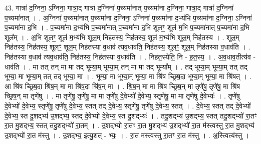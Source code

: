 \documentclass[17pt]{extarticle}
\begin{document}
43. गात्रा॑ द॒ग्निना॒ ऽग्निना॒ गात्रा॒द् गात्रा॑ द॒ग्निना॑ प॒च्यमा॑नात् प॒च्यमा॑ना द॒ग्निना॒ गात्रा॒द् गात्रा॑ द॒ग्निना॑ प॒च्यमा॑नात् । . अ॒ग्निना॑ प॒च्यमा॑नात् प॒च्यमा॑ना द॒ग्निना॒ ऽग्निना॑ प॒च्यमा॑ना द॒भ्य॑भि प॒च्यमा॑ना द॒ग्निना॒ ऽग्निना॑ प॒च्यमा॑ना द॒भि । . प॒च्यमा॑ना द॒भ्य॑भि प॒च्यमा॑नात् प॒च्यमा॑ना द॒भि शूलꣳ॒॒ शूल॑ म॒भि प॒च्यमा॑नात् प॒च्यमा॑ना द॒भि शूल᳚म् । . अ॒भि शूलꣳ॒॒ शूल॑ म॒भ्य॑भि शूल॒म् निह॑तस्य॒ निह॑तस्य॒ शूल॑ म॒भ्य॑भि शूल॒म् निह॑तस्य । . शूल॒म् निह॑तस्य॒ निह॑तस्य॒ शूलꣳ॒॒ शूल॒म् निह॑तस्या व॒धाव॑ त्यव॒धाव॑ति॒ निह॑तस्य॒ शूलꣳ॒॒ शूल॒म् निह॑तस्या व॒धाव॑ति । . निह॑तस्या व॒धाव॑ त्यव॒धाव॑ति॒ निह॑तस्य॒ निह॑तस्या व॒धाव॑ति । . निह॑त॒स्येति॒ नि - ह॒त॒स्य॒ । . अ॒व॒धाव॒तीत्य॑व - धाव॑ति । . मा तत् तन् मा मा तद् भूम्या॒म् भूम्या॒म् तन् मा मा तद् भूम्या᳚म् । . तद् भूम्या॒म् भूम्या॒म् तत् तद् भूम्या॒ मा भूम्या॒म् तत् तद् भूम्या॒ मा । . भूम्या॒ मा भूम्या॒म् भूम्या॒ मा श्रि॑ष च्छ्रिष॒दा भूम्या॒म् भूम्या॒ मा श्रि॑षत् । . आ श्रि॑ष च्छ्रिष॒दा श्रि॑ष॒न् मा मा श्रि॑ष॒दा श्रि॑ष॒न् मा । . श्रि॒ष॒न् मा मा श्रि॑ष च्छ्रिष॒न् मा तृणे॑षु॒ तृणे॑षु॒ मा श्रि॑ष च्छ्रिष॒न् मा तृणे॑षु । . मा तृणे॑षु॒ तृणे॑षु॒ मा मा तृणे॑षु दे॒वेभ्यो॑ दे॒वेभ्य॒ स्तृणे॑षु॒ मा मा तृणे॑षु दे॒वेभ्यः॑ । . तृणे॑षु दे॒वेभ्यो॑ दे॒वेभ्य॒ स्तृणे॑षु॒ तृणे॑षु दे॒वेभ्य॒ स्तत् तद् दे॒वेभ्य॒ स्तृणे॑षु॒ तृणे॑षु दे॒वेभ्य॒ स्तत् । . दे॒वेभ्य॒ स्तत् तद् दे॒वेभ्यो॑ दे॒वेभ्य॒ स्त दु॒शद्भ्य॑ उ॒शद्भ्य॒ स्तद् दे॒वेभ्यो॑ दे॒वेभ्य॒ स्त दु॒शद्भ्यः॑ । . तदु॒शद्भ्य॑ उ॒शद्भ्य॒ स्तत् तदु॒शद्भ्यो॑ रा॒तꣳ रा॒त मु॒शद्भ्य॒ स्तत् तदु॒शद्भ्यो॑ रा॒तम् । . उ॒शद्भ्यो॑ रा॒तꣳ रा॒त मु॒शद्भ्य॑ उ॒शद्भ्यो॑ रा॒त म॑स्त्वस्तु रा॒त मु॒शद्भ्य॑ उ॒शद्भ्यो॑ रा॒त म॑स्तु । . उ॒शद्भ्य॒ इत्यु॒शत् - भ्यः॒ । . रा॒त म॑स्त्वस्तु रा॒तꣳ रा॒त म॑स्तु । . अ॒स्त्वित्य॑स्तु । \newline
\pagebreak
{}
\end{document}
